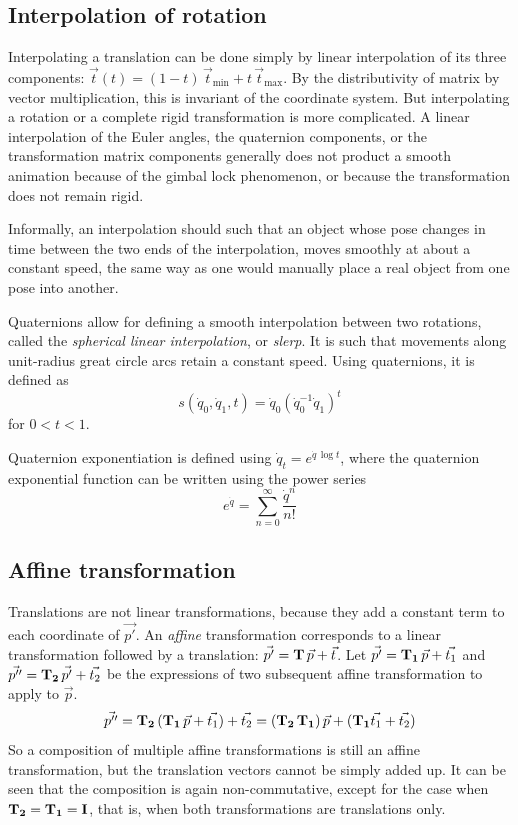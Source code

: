 \subsection{Interpolation of rotation} \label{sec:rot_interp}
Interpolating a translation can be done simply by linear interpolation of its three components: $\vec{t}(t) = (1 - t) \, \vec{t}_\text{min} + t \, \vec{t}_{\text{max}}$. By the distributivity of matrix by vector multiplication, this is invariant of the coordinate system. But interpolating a rotation or a complete rigid transformation is more complicated. A linear interpolation of the Euler angles, the quaternion components, or the transformation matrix components generally does not product a smooth animation because of the gimbal lock phenomenon, or because the transformation does not remain rigid.

Informally, an interpolation should such that an object whose pose changes in time between the two ends of the interpolation, moves smoothly at about a constant speed, the same way as one would manually place a real object from one pose into another.

Quaternions allow for defining a smooth interpolation between two rotations, called the \emph{spherical linear interpolation}, or \emph{slerp}. It is such that movements along unit-radius great circle arcs retain a constant speed. Using quaternions, it is defined as
\begin{equation}
s(\dot{q}_0, \dot{q}_1, t) = \dot{q}_0 (\dot{q}^{-1}_0 \dot{q}_1)^t
\end{equation}
for $0 < t < 1$.

Quaternion exponentiation is defined using $\dot{q}_t = e^{\dot{q} \, \log t}$, where the quaternion exponential function can be written using the power series
\begin{equation}
e^{\dot{q}} = \sum_{n=0}^{\infty} \frac{\dot{q}^n}{n!}
\end{equation}


\subsection{Affine transformation}
Translations are not linear transformations, because they add a constant term to each coordinate of $\vec{p'}$. An \emph{affine} transformation corresponds to a linear transformation followed by a translation: $\vec{p'} = \mathbf{T} \, \vec{p} + \vec{t}$. Let $\vec{p'} = \mathbf{T_1} \, \vec{p} + \vec{t_1}$ and $\vec{p''} = \mathbf{T_2} \, \vec{p'} + \vec{t_2}$ be the expressions of two subsequent affine transformation to apply to $\vec{p}$.
\begin{equation}
	\vec{p''} = \mathbf{T_2} \, (\mathbf{T_1} \, \vec{p} + \vec{t_1}) + \vec{t_2} = (\mathbf{T_2} \, \mathbf{T_1}) \, \vec{p} + (\mathbf{T_1} \vec{t_1} + \vec{t_2})
\end{equation}
So a composition of multiple affine transformations is still an affine transformation, but the translation vectors cannot be simply added up. It can be seen that the composition is again non-commutative, except for the case when $\mathbf{T_2} = \mathbf{T_1} = \mathbf{I}$, that is, when both transformations are translations only.

